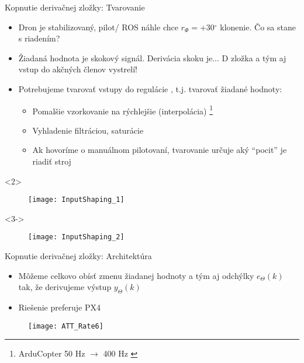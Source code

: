 %
%
\begin{frame}[t]{Kopnutie derivačnej zložky: Tvarovanie}
  \begin{itemize}
  \item<1-> Dron je stabilizovaný, pilot/  ROS náhle chce $r_{\Phi}=$+30$^\circ$ klonenie. Čo sa stane s riadením?
  \item<2->  Žiadaná hodnota je skokový signál. Derivácia skoku je... D zložka a tým aj vstup do akčných členov vystrelí!
  \item<3->  Potrebujeme tvarovať vstupy do regulácie , t.j. tvarovať žiadané hodnoty:
        \begin{itemize}
  \item Pomalšie vzorkovanie na rýchlejšie (interpolácia) \footnote{ArduCopter 50 Hz $\rightarrow$ 400 Hz \citep{AP:PID}}
  \item Vyhladenie filtráciou, saturácie
  \item<4-> Ak hovoríme o manuálnom pilotovaní, tvarovanie určuje aký ``pocit'' je riadiť stroj
  \end{itemize}
  \end{itemize}
        \begin{onlyenv}<2>
  \begin{figure}
\centering
  \texttt{[image: InputShaping\_1]}\\
\end{figure}
\end{onlyenv}


        \begin{onlyenv}<3->
  \begin{figure}
\centering
  \texttt{[image: InputShaping\_2]}\\
\end{figure}
\end{onlyenv}
\end{frame}
%
%
\begin{frame}[t]{Kopnutie derivačnej zložky: Architektúra}
  \begin{itemize}
    \item<1-> Môžeme celkovo obísť zmenu žiadanej hodnoty a tým aj odchýlky  $e_\Theta(k)$ tak, že derivujeme výstup $y_\Theta(k)$
    \item<2-> Riešenie preferuje PX4
    \end{itemize}
  \begin{figure}
\centering
  \texttt{[image: ATT\_Rate6]}\\
\end{figure}
\end{frame}


